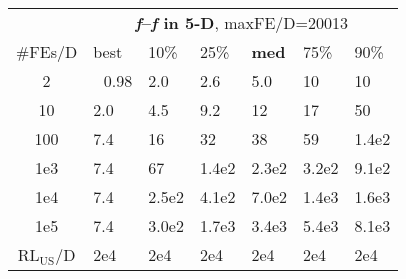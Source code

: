 \begin{tabular}{c|llllll}
 & \multicolumn{6}{|c}{\textbf{\textit{f}\raisebox{-0.35ex}{1}--\textit{f}\raisebox{-0.35ex}{24} in 5-D}, maxFE/D=20013}\\
\#FEs/D & best & 10\% & 25\% & \textbf{med} & 75\% & 90\%\\
2 & ~\,0.98 & \hspace*{1ex}2.0 & \hspace*{1ex}2.6 & \hspace*{1ex}5.0 & 10 & 10\\
10 & \hspace*{1ex}2.0 & \hspace*{1ex}4.5 & \hspace*{1ex}9.2 & 12 & 17 & 50\\
100 & \hspace*{1ex}7.4 & 16 & 32 & 38 & 59 & 1.4e2\\
1e3 & \hspace*{1ex}7.4 & 67 & 1.4e2 & 2.3e2 & 3.2e2 & 9.1e2\\
1e4 & \hspace*{1ex}7.4 & 2.5e2 & 4.1e2 & 7.0e2 & 1.4e3 & 1.6e3\\
1e5 & \hspace*{1ex}7.4 & 3.0e2 & 1.7e3 & 3.4e3 & 5.4e3 & 8.1e3\\
$\text{RL}_{\text{US}}$/D & 2e4 & 2e4 & 2e4 & 2e4 & 2e4 & 2e4
\end{tabular}
